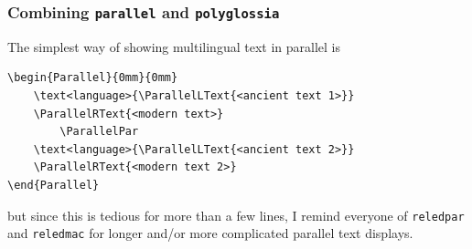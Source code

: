 \documentclass{beamer}
\begin{document}
\begin{frame}[fragile]
	\frametitle[Combining parallel and polyglossia]{Combining \texttt{parallel} and \texttt{polyglossia}}

{\small The simplest way of showing multilingual text in parallel is} \break

{\scriptsize \begin{lstlisting}
\begin{Parallel}{0mm}{0mm}
	\text<language>{\ParallelLText{<ancient text 1>}}
	\ParallelRText{<modern text>}
		\ParallelPar
	\text<language>{\ParallelLText{<ancient text 2>}}
	\ParallelRText{<modern text 2>}
\end{Parallel}	
\end{lstlisting}} \break

\vspace{1em}

{\small but since this is tedious for more than a few lines, I remind everyone of \texttt{reledpar} and \texttt{reledmac} for longer and/or more complicated parallel text displays.} \break

\end{frame}
\end{document}
